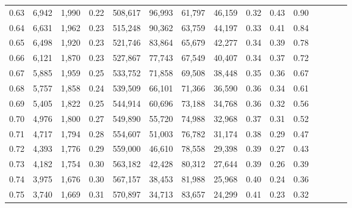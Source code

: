 \begin{tabular}{rrrcrrrrrrrrrrr}
0.63 &   6,942 &  1,990 &                                       0.22 &  508,617 &   96,993 &   61,797 &   46,159 &  0.32 &  0.43 &                         0.90 \\
0.64 &   6,631 &  1,962 &                                       0.23 &  515,248 &   90,362 &   63,759 &   44,197 &  0.33 &  0.41 &                         0.84 \\
0.65 &   6,498 &  1,920 &                                       0.23 &  521,746 &   83,864 &   65,679 &   42,277 &  0.34 &  0.39 &                         0.78 \\
0.66 &   6,121 &  1,870 &                                       0.23 &  527,867 &   77,743 &   67,549 &   40,407 &  0.34 &  0.37 &                         0.72 \\
0.67 &   5,885 &  1,959 &                                       0.25 &  533,752 &   71,858 &   69,508 &   38,448 &  0.35 &  0.36 &                         0.67 \\
0.68 &   5,757 &  1,858 &                                       0.24 &  539,509 &   66,101 &   71,366 &   36,590 &  0.36 &  0.34 &                         0.61 \\
0.69 &   5,405 &  1,822 &                                       0.25 &  544,914 &   60,696 &   73,188 &   34,768 &  0.36 &  0.32 &                         0.56 \\
0.70 &   4,976 &  1,800 &                                       0.27 &  549,890 &   55,720 &   74,988 &   32,968 &  0.37 &  0.31 &                         0.52 \\
0.71 &   4,717 &  1,794 &                                       0.28 &  554,607 &   51,003 &   76,782 &   31,174 &  0.38 &  0.29 &                         0.47 \\
0.72 &   4,393 &  1,776 &                                       0.29 &  559,000 &   46,610 &   78,558 &   29,398 &  0.39 &  0.27 &                         0.43 \\
0.73 &   4,182 &  1,754 &                                       0.30 &  563,182 &   42,428 &   80,312 &   27,644 &  0.39 &  0.26 &                         0.39 \\
0.74 &   3,975 &  1,676 &                                       0.30 &  567,157 &   38,453 &   81,988 &   25,968 &  0.40 &  0.24 &                         0.36 \\
0.75 &   3,740 &  1,669 &                                       0.31 &  570,897 &   34,713 &   83,657 &   24,299 &  0.41 &  0.23 &                         0.32 \\

\end{tabular}
